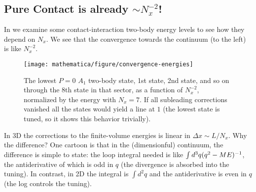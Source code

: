 \subsection{Pure Contact is already $\sim N_x^{-2}$!}
\label{sec:automatic improvement}

In  we examine some contact-interaction two-body energy levels to see how they depend on $N_x$.
We see that the convergence towards the continuum (to the left) is like $N_x^{-2}$.

\begin{figure}
	\texttt{[image: mathematica/figure/convergence-energies]}
	\caption{
		The lowest $P=0$ $A_1$ two-body state, 1st state, 2nd state, and so on through the 8th state in that sector, as a function of $N_x^{-2}$, normalized by the energy with $N_x=7$.
		If all subleading corrections vanished all the states would yield a line at $1$ (the lowest state is tuned, so it shows this behavior trivially).
	}
	\label{fig:convergence energies}
\end{figure}

In 3D the corrections to the finite-volume energies is linear in $\Delta x \sim L/N_x$.
Why the difference?
One cartoon is that in the (dimensionful) continuum, the difference is simple to state: the loop integral needed is like $\int d^3q (q^2-ME)^{-1}$, the antiderivative of which is odd in $q$ (the divergence is absorbed into the tuning).
In contrast, in 2D the integral is $\int d^2q$ and the antiderivative is even in $q$ (the log controls the tuning).
